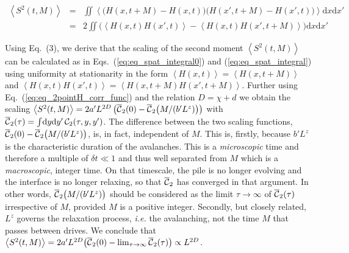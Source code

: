\documentclass[doublecol]{epl2}
\makeatletter
\newcommand{\ave}[1]{\left\langle{#1}\right\rangle}
\newcommand{\latin}[1]{{\it #1}}
\newcommand{\ie}{\latin{i.e.}\@\xspace}
\newcommand{\plaind}{\text{d}}
\newcommand{\elabel}[1]{\label{eq:#1}}
\newcommand{\eref}[1]{(\ref{eq:#1})}
\newcommand{\Eref}[1]{Eq.~(\ref{eq:#1})}
\newcommand{\Esref}[1]{Eqs.~(\ref{eq:#1})}
\newcommand{\bungledXR}[2]{#2}
\makeatother
\begin{document}
\begin{widetext}
\begin{eqnarray}
\ave{S^2(t,M)} &=& \iint \ave{\big(H(x,t+M)-H(x,t)\big)\big(H(x',t+M)-H(x',t)\big)}\plaind x \plaind x'\elabel{eq_spat_integral0}\\
&=& 2\iint \big(\ave{H(x,t)H(x',t)}-\ave{H(x,t)H(x',t+M)}\big)\plaind x \plaind x' \elabel{eq_spat_integral}
\end{eqnarray}
\end{widetext}

Using \bungledXR{\Eref{eq_def_S}}{Eq.~(3)}, we derive that the scaling of the second moment $\ave{S^2(t,M)}$ can be calculated as in \Esref{eq_spat_integral0} and \eref{eq_spat_integral}
using uniformity at stationarity in the form
$\ave{H(x,t)}=\ave{H(x,t+M)}$ and
$\ave{H(x,t)H(x',t)}=\ave{H
(x,t+M)H(x',t+M)}$. Further using \Eref{eq_2pointH_corr_func} and the relation $D=\chi+d$ we obtain the scaling
$\ave{S^2(t,M)}=2 a'L^{2D} \left(\CCbar_2(0)-\CCbar_2\big(M/(b'L^z)\big)\right)$
with
$\CCbar_2(\tau)=\int\dint{y}\dint{y'} \mathcal{C}_2(\tau,y,y')$.
The difference between the two scaling functions, $\overline{\mathcal{C}}_2(0)-\overline{\mathcal{C}}_2\big(M/(b'L^z)\big)$, is, in fact, independent
of $M$. This is, firstly, because $b'L^z$ is the characteristic duration of
the avalanches. This is a \emph{microscopic} time and therefore a multiple
of $\delta t\ll 1$ and thus well separated from $M$ which is a \emph{macroscopic},
integer time.
On that timescale, the pile is no longer evolving and the interface is no longer relaxing, 
so that $\overline{\mathcal{C}}_2$ has converged in that argument. In other words, 
$\overline{\mathcal{C}}_2\big(M/(b'L^z)\big)$ should be considered as the limit $\tau\to\infty$
of $\overline{\mathcal{C}}_2(\tau)$ irrespective of $M$, provided $M$ is a positive integer.
Secondly, but closely related, $L^z$ governs the relaxation process, \ie the
avalanching, not the time $M$ that passes between drives. We conclude that
$\ave{S^2(t,M)}=2a' L^{2D} \big(\CCbar_2(0)-\lim_{\tau\to\infty}\CCbar_2(\tau)\big)\propto L^{2D}$.
\end{document}
